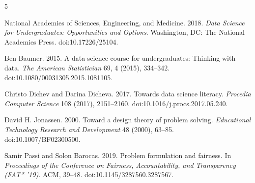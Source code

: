 \documentclass[sigconf,screen,anonymous]{acmart}
\begin{document}
\vspace{-0.5em}
\balance
{\scriptsize
\begin{thebibliography}{5}
\setlength{\itemsep}{-1pt}
\setlength{\parskip}{0pt}

National Academies of Sciences, Engineering, and Medicine. 2018.
\emph{Data Science for Undergraduates: Opportunities and Options}.
Washington, DC: The National Academies Press. doi:10.17226/25104.

Ben Baumer. 2015. A data science course for undergraduates: Thinking with data.
\emph{The American Statistician} 69, 4 (2015), 334--342. doi:10.1080/00031305.2015.1081105.

Christo Dichev and Darina Dicheva. 2017. Towards data science literacy.
\emph{Procedia Computer Science} 108 (2017), 2151--2160.
doi:10.1016/j.procs.2017.05.240.

David H. Jonassen. 2000. Toward a design theory of problem solving.
\emph{Educational Technology Research and Development} 48 (2000), 63--85.
doi:10.1007/BF02300500.

Samir Passi and Solon Barocas. 2019. Problem formulation and fairness.
In \emph{Proceedings of the Conference on Fairness, Accountability, and Transparency (FAT* '19)}.
ACM, 39--48. doi:10.1145/3287560.3287567.

\end{thebibliography}
}
\end{document}
